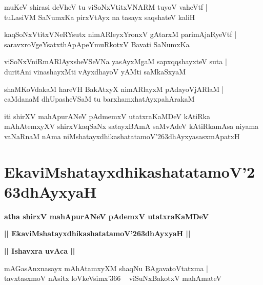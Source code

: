 \documentclass[twoside,12pt,openright]{book}
\def\S{\char'263}
\newcounter{shloka}[chapter]
\def\uvaca#1{\centerline{{\large\textbf{#1}}}}
\begin{document}
\begin{shloka}%
muKeV shirasi deVheV tu viSoNxVtitxVNARM tuyoV vaheVtf |\\
tuLasiVM SaNumxKa pirxVtAyx na tasayx saqshateV kaliH 
\end{shloka}

\begin{shloka}%
kaqSoNxVtitxVNeRYsutx nimARleyxYronxV gAtarxM parimAjaRyeVtf |\\
saravxroVgeYsatxthApApeYmuRkotxV Bavati SaNumxKa
\end{shloka}

\begin{shloka}%
viSoNxVniRmARlAyxsheVSeVNa yasAyxMgaM sapxqqshayxteV suta |\\
duritAni vinashayxMti vAyxdhayoV yAMti saMkaSxyaM 
\end{shloka}

\begin{shloka}%
shaMKoVdakaM hareVH BakAtxyX nimARlayxM pAdayoVjARlaM |\\
caMdanaM dhUpasheVSaM tu barxhamxhatAyxpahArakaM 
\end{shloka}

\begin{center}
iti shirXV mahApurANeV pAdmemxV utatxraKaMDeV kAtiRka mAhAtemxyXV shirxVkaqSaNx satayxBAmA 
saMvAdeV kAtiRkamAsa niyama vaNaRnaM nAma niMshatayxdhikashatatamoV\S dhAyxyasasxmApatxH 
\end{center}

\chapter{EkaviMshatayxdhikashatatamoV\S dhAyxyaH}

\begin{center}
{\LARGE\bfseries atha shirxV mahApurANeV pAdemxV utatxraKaMDeV}
\end{center}

\begin{center}
{\LARGE\bfseries || EkaviMshatayxdhikashatatamoV\S dhAyxyaH || }
\end{center}

\uvaca{|| Ishavxra uvAca ||}

\begin{shloka}%
mAGasAnxnasayx mAhAtamxyXM shaqNu BAgavatoVtatxma |\\
tavxtasxmoV nAsitx loVkeVsimx\char'366 ~ viSuNxBakotxV mahAmateV 
\end{shloka}
\end{document}
